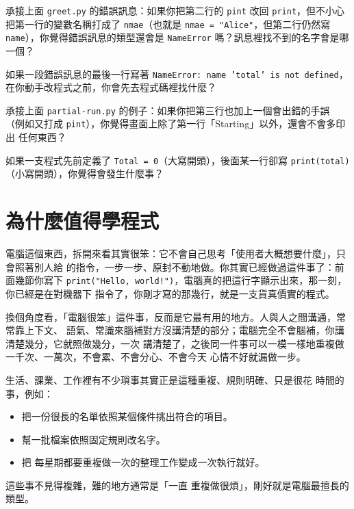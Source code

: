 \begin{drills}[label=drills:reading-errors]
\item 承接上面 \texttt{greet.py} 的錯誤訊息：如果你把第二行的 \texttt{pint} 改回
\texttt{print}，但不小心把第一行的變數名稱打成了 \texttt{nmae}（也就是
\texttt{nmae = "Alice"}，但第二行仍然寫 \texttt{name}），你覺得錯誤訊息的類型還會是
\texttt{NameError} 嗎？訊息裡找不到的名字會是哪一個？
\item 如果一段錯誤訊息的最後一行寫著 \texttt{NameError: name 'total' is not defined}，
在你動手改程式之前，你會先去程式碼裡找什麼？
\item 承接上面 \texttt{partial-run.py} 的例子：如果你把第三行也加上一個會出錯的手誤
（例如又打成 \texttt{pint}），你覺得畫面上除了第一行「Starting」以外，還會不會多印出
任何東西？
\item 如果一支程式先前定義了 \texttt{Total = 0}（大寫開頭），後面某一行卻寫
\texttt{print(total)}（小寫開頭），你覺得會發生什麼事？
\end{drills}

\section{為什麼值得學程式}
\label{sec:why-program}

電腦這個東西，拆開來看其實很笨：它不會自己思考「使用者大概想要什麼」，只會照著別人給
的指令，一步一步、原封不動地做。你其實已經做過這件事了：前面幾節你寫下
\texttt{print("Hello, world!")}，電腦真的把這行字顯示出來，那一刻，你已經是在對機器下
指令了，你剛才寫的那幾行，就是一支貨真價實的程式。

換個角度看，「電腦很笨」這件事，反而是它最有用的地方。人與人之間溝通，常常靠上下文、
語氣、常識來腦補對方沒講清楚的部分；電腦完全不會腦補，你講清楚幾分，它就照做幾分，一次
講清楚了，之後同一件事可以一模一樣地重複做一千次、一萬次，不會累、不會分心、不會今天
心情不好就漏做一步。

生活、課業、工作裡有不少瑣事其實正是這種重複、規則明確、只是很花
時間的事，例如：

\begin{itemize}
\item 把一份很長的名單依照某個條件挑出符合的項目。
\item 幫一批檔案依照固定規則改名字。
\item 把
每星期都要重複做一次的整理工作變成一次執行就好。
\end{itemize}

這些事不見得複雜，難的地方通常是「一直
重複做很煩」，剛好就是電腦最擅長的類型。

